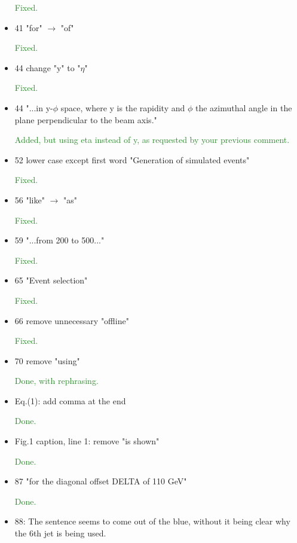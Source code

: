 \documentclass[paper=a4, fontsize=11pt]{scrartcl}
\begin{document}
\begin{itemize}
\textcolor{ForestGreen}{Fixed.}

\item 41 "for" $\rightarrow$  "of"

\textcolor{ForestGreen}{Fixed.}

\item 44 change "y" to "$\eta$"

\textcolor{ForestGreen}{Fixed.}

\item 44 "...in y-$\phi$ space, where y is the rapidity and $\phi$
 the azimuthal angle in the plane perpendicular to the beam axis."
 
\textcolor{ForestGreen}{Added, but using eta instead of y, as requested by your previous comment.}

\item 52 lower case except first word "Generation of simulated events"

\textcolor{ForestGreen}{Fixed.}

\item 56 "like" $\rightarrow$  "as"

\textcolor{ForestGreen}{Fixed.}

\item 59 "...from 200 to 500..."

\textcolor{ForestGreen}{Fixed.}

\item 65 "Event selection"

\textcolor{ForestGreen}{Fixed.}

\item 66 remove unnecessary "offline"

\textcolor{ForestGreen}{Fixed.}

\item 70 remove "using"

\textcolor{ForestGreen}{Done, with rephrasing.}

\item Eq.(1): add comma at the end

\textcolor{ForestGreen}{Done.}

\item Fig.1 caption, line 1: remove "is shown"

\textcolor{ForestGreen}{Done.}

\item 87 "for the diagonal offset DELTA of 110 GeV"

\textcolor{ForestGreen}{Done.}

\item 88: The sentence seems to come out of the blue, without it being clear why
the 6th jet is being used.


\end{itemize}
\end{document}
